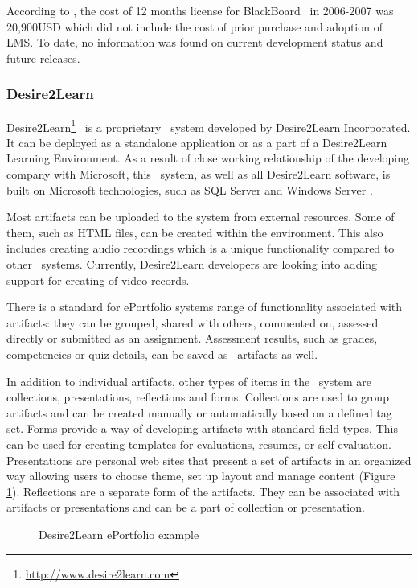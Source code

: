 According to \citet{Sweat-Guy2007}, the cost of 12 months license for
BlackBoard \ep~in 2006-2007 was 20,900USD which did not include the cost of
prior purchase and adoption of LMS. To date, no information was found on current
development status and future releases.

\subsubsection{Desire2Learn}
Desire2Learn\footnote{\url{http://www.desire2learn.com}} \ep~is a proprietary
\ep~system developed by Desire2Learn Incorporated. It can be deployed as a
standalone application or as a part of a Desire2Learn Learning Environment. As a
result of close working relationship of the developing company with Microsoft,
this \ep~system, as well as all Desire2Learn software, is built on Microsoft
technologies, such as SQL Server and Windows Server \citep{AAEEBL2011a}.

Most artifacts can be uploaded to the system from external resources. Some of
them, such as HTML files, can be created within the environment. This also
includes creating audio recordings which is a unique functionality compared to
other \ep~systems. Currently, Desire2Learn developers are looking into adding
support for creating of video records.

There is a standard for ePortfolio systems range of functionality associated
with artifacts: they can be grouped, shared with others, commented on, assessed
directly or submitted as an assignment. Assessment results, such as grades,
competencies or quiz details, can be saved as \ep~artifacts as well.

In addition to individual artifacts, other types of items in the \ep~system are
collections, presentations, reflections and forms. Collections are used to group
artifacts and can be created manually or automatically based on a defined tag
set. Forms provide a way of developing artifacts with standard field types. This
can be used for creating templates for evaluations, resumes, or self-evaluation.
Presentations are personal web sites that present a set of artifacts in an
organized way allowing users to choose theme, set up layout and manage content
(Figure \ref{fig:d2ep}). Reflections are a separate form of the artifacts. They
can be associated with artifacts or presentations and can be a part of
collection or presentation.

\begin{figure}[htb]
\centering
\setlength\fboxsep{0pt}
\setlength\fboxrule{0.5pt}
\fbox{\texttt{[image: CH4-F7-D2L]}}
\caption[Desire2Learn ePortfolio example]{Desire2Learn ePortfolio example
\citep{Desire2LearnIncorporated2011}}
\label{fig:d2ep} 
\end{figure}

